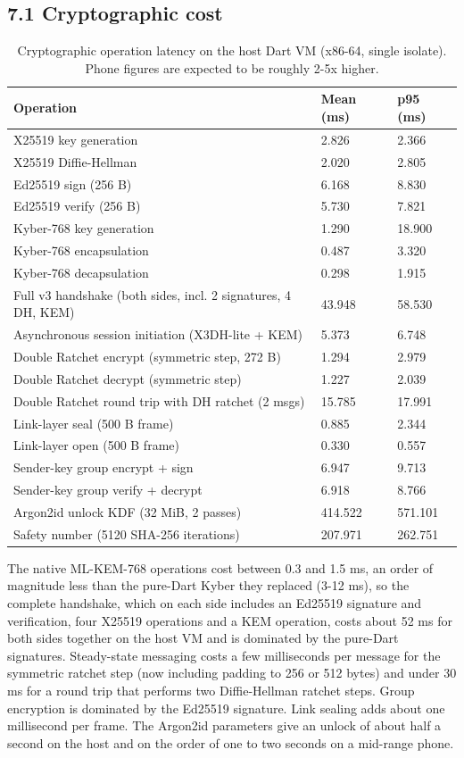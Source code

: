\documentclass[conference]{IEEEtran}
\begin{document}
\subsection{7.1 Cryptographic cost}
\begin{table}[t]\centering\footnotesize
\caption{Cryptographic operation latency on the host Dart VM (x86-64, single isolate). Phone figures are expected to be roughly 2-5x higher.}
\begin{tabular}{lll}\toprule
Operation & Mean (ms) & p95 (ms) \\ \midrule
X25519 key generation & 2.826 & 2.366 \\
X25519 Diffie-Hellman & 2.020 & 2.805 \\
Ed25519 sign (256 B) & 6.168 & 8.830 \\
Ed25519 verify (256 B) & 5.730 & 7.821 \\
Kyber-768 key generation & 1.290 & 18.900 \\
Kyber-768 encapsulation & 0.487 & 3.320 \\
Kyber-768 decapsulation & 0.298 & 1.915 \\
Full v3 handshake (both sides, incl. 2 signatures, 4 DH, KEM) & 43.948 & 58.530 \\
Asynchronous session initiation (X3DH-lite + KEM) & 5.373 & 6.748 \\
Double Ratchet encrypt (symmetric step, 272 B) & 1.294 & 2.979 \\
Double Ratchet decrypt (symmetric step) & 1.227 & 2.039 \\
Double Ratchet round trip with DH ratchet (2 msgs) & 15.785 & 17.991 \\
Link-layer seal (500 B frame) & 0.885 & 2.344 \\
Link-layer open (500 B frame) & 0.330 & 0.557 \\
Sender-key group encrypt + sign & 6.947 & 9.713 \\
Sender-key group verify + decrypt & 6.918 & 8.766 \\
Argon2id unlock KDF (32 MiB, 2 passes) & 414.522 & 571.101 \\
Safety number (5120 SHA-256 iterations) & 207.971 & 262.751 \\
\bottomrule\end{tabular}\end{table}
The native ML-KEM-768 operations cost between 0.3 and 1.5 ms, an order of magnitude less than the pure-Dart Kyber they replaced (3-12 ms), so the complete handshake, which on each side includes an Ed25519 signature and verification, four X25519 operations and a KEM operation, costs about 52 ms for both sides together on the host VM and is dominated by the pure-Dart signatures. Steady-state messaging costs a few milliseconds per message for the symmetric ratchet step (now including padding to 256 or 512 bytes) and under 30 ms for a round trip that performs two Diffie-Hellman ratchet steps. Group encryption is dominated by the Ed25519 signature. Link sealing adds about one millisecond per frame. The Argon2id parameters give an unlock of about half a second on the host and on the order of one to two seconds on a mid-range phone.
\end{document}
